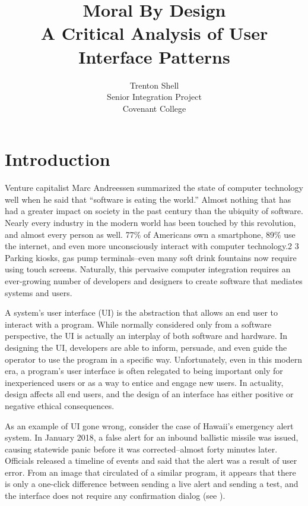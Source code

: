 \documentclass[12pt, oneside]{article}
\title{%
  Moral By Design \\
  \large A Critical Analysis of User Interface Patterns \\ 
  }
\author{%
  Trenton Shell \\
  Senior Integration Project \\
  Covenant College
  }
\begin{document}
\clearpage\maketitle
\thispagestyle{empty}

\newpage
\setcounter{page}{1}


\section{Introduction}

Venture capitalist Marc Andreessen summarized the state of computer technology well when he said that ``software is eating the world.'' \cite{andreessen_2018} Almost nothing that has had a greater impact on society in the past century than the ubiquity of software. Nearly every industry in the modern world has been touched by this revolution, and almost every person as well. 77\% of Americans own a smartphone, 89\% use the internet, and even more unconsciously interact with computer technology.2 3 Parking kiosks, gas pump terminals–even many soft drink fountains now require using touch screens. Naturally, this pervasive computer integration requires an ever-growing number of developers and designers to create software that mediates systems and users.

A system's user interface (UI) is the abstraction that allows an end user to interact with a program. While normally considered only from a software perspective, the UI is actually an interplay of both software and hardware. In designing the UI, developers are able to inform, persuade, and even guide the operator to use the program in a specific way. Unfortunately, even in this modern era, a program's user interface is often relegated to being important only for inexperienced users or as a way to entice and engage new users. In actuality, design affects all end users, and the design of an interface has either positive or negative ethical consequences.

As an example of UI gone wrong, consider the case of Hawaii's emergency alert system. In January 2018, a false alert for an inbound ballistic missile was issued, causing statewide panic before it was corrected–almost forty minutes later. Officials released a timeline of events and said that the alert was a result of user error. From an image that circulated of a similar program, it appears that there is only a one-click difference between sending a live alert and sending a test, and the interface does not require any confirmation dialog (see \cite[Fig. \ref{fig:alert}]{beat_2018}).
\end{document}
